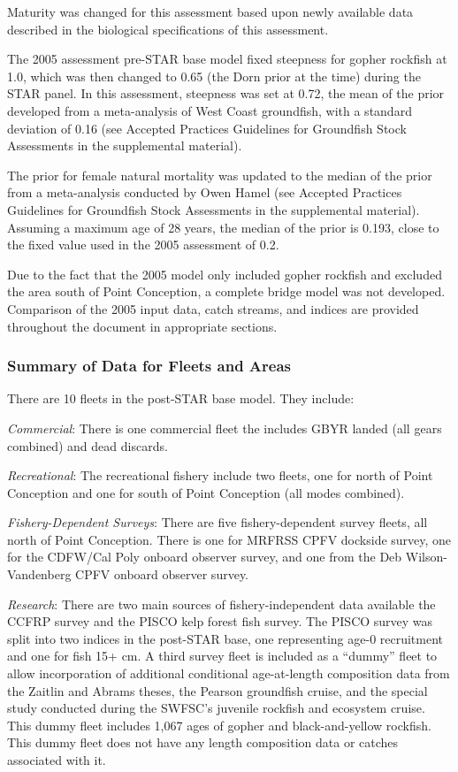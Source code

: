 \documentclass[12pt,]{article}
\begin{document}
Maturity was changed for this assessment based upon newly available data
described in the biological specifications of this assessment.

The 2005 assessment pre-STAR base model fixed steepness for gopher
rockfish at 1.0, which was then changed to 0.65 (the Dorn prior at the
time) during the STAR panel. In this assessment, steepness was set at
0.72, the mean of the prior developed from a meta-analysis of West Coast
groundfish, with a standard deviation of 0.16 (see Accepted Practices
Guidelines for Groundfish Stock Assessments in the supplemental
material).

The prior for female natural mortality was updated to the median of the
prior from a meta-analysis conducted by Owen Hamel (see Accepted
Practices Guidelines for Groundfish Stock Assessments in the
supplemental material). Assuming a maximum age of 28 years, the median
of the prior is 0.193, close to the fixed value used in the 2005
assessment of 0.2.

Due to the fact that the 2005 model only included gopher rockfish and
excluded the area south of Point Conception, a complete bridge model was
not developed. Comparison of the 2005 input data, catch streams, and
indices are provided throughout the document in appropriate sections.

\subsubsection{Summary of Data for Fleets and
Areas}\label{summary-of-data-for-fleets-and-areas}

There are 10 fleets in the post-STAR base model. They include:

\emph{Commercial}: There is one commercial fleet the includes GBYR
landed (all gears combined) and dead discards.

\emph{Recreational}: The recreational fishery include two fleets, one
for north of Point Conception and one for south of Point Conception (all
modes combined).

\emph{Fishery-Dependent Surveys}: There are five fishery-dependent
survey fleets, all north of Point Conception. There is one for MRFRSS
CPFV dockside survey, one for the CDFW/Cal Poly onboard observer survey,
and one from the Deb Wilson-Vandenberg CPFV onboard observer survey.

\emph{Research}: There are two main sources of fishery-independent data
available the CCFRP survey and the PISCO kelp forest fish survey. The
PISCO survey was split into two indices in the post-STAR base, one
representing age-0 recruitment and one for fish 15+ cm. A third survey
fleet is included as a ``dummy'' fleet to allow incorporation of
additional conditional age-at-length composition data from the Zaitlin
and Abrams theses, the Pearson groundfish cruise, and the special study
conducted during the SWFSC's juvenile rockfish and ecosystem cruise.
This dummy fleet includes 1,067 ages of gopher and black-and-yellow
rockfish. This dummy fleet does not have any length composition data or
catches associated with it.
\end{document}
